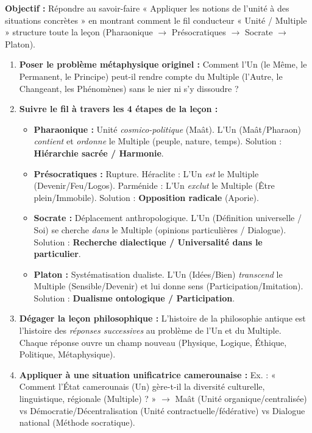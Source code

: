 \documentclass[11pt]{article}
\begin{document}
\begin{methode}
\textbf{Objectif :} Répondre au savoir-faire « Appliquer les notions de l'unité à des situations concrètes » en montrant comment le fil conducteur « Unité / Multiple » structure toute la leçon (Pharaonique $\rightarrow$ Présocratiques $\rightarrow$ Socrate $\rightarrow$ Platon).
\begin{enumerate}
    \item \textbf{Poser le problème métaphysique originel :} Comment l'Un (le Même, le Permanent, le Principe) peut-il rendre compte du Multiple (l'Autre, le Changeant, les Phénomènes) sans le nier ni s'y dissoudre ?
    \item \textbf{Suivre le fil à travers les 4 étapes de la leçon :}
        \begin{itemize}
            \item \textbf{Pharaonique :} Unité \emph{cosmico-politique} (Maât). L'Un (Maât/Pharaon) \emph{contient} et \emph{ordonne} le Multiple (peuple, nature, temps). Solution : \textbf{Hiérarchie sacrée / Harmonie}.
            \item \textbf{Présocratiques :} Rupture. Héraclite : L'Un \emph{est} le Multiple (Devenir/Feu/Logos). Parménide : L'Un \emph{exclut} le Multiple (Être plein/Immobile). Solution : \textbf{Opposition radicale} (Aporie).
            \item \textbf{Socrate :} Déplacement anthropologique. L'Un (Définition universelle / Soi) se cherche \emph{dans} le Multiple (opinions particulières / Dialogue). Solution : \textbf{Recherche dialectique / Universalité dans le particulier}.
            \item \textbf{Platon :} Systématisation dualiste. L'Un (Idées/Bien) \emph{transcend} le Multiple (Sensible/Devenir) et lui donne sens (Participation/Imitation). Solution : \textbf{Dualisme ontologique / Participation}.
        \end{itemize}
    \item \textbf{Dégager la leçon philosophique :} L'histoire de la philosophie antique est l'histoire des \emph{réponses successives} au problème de l'Un et du Multiple. Chaque réponse ouvre un champ nouveau (Physique, Logique, Éthique, Politique, Métaphysique).
    \item \textbf{Appliquer à une situation unificatrice camerounaise :} Ex. : « Comment l'État camerounais (Un) gère-t-il la diversité culturelle, linguistique, régionale (Multiple) ? » $\rightarrow$ Maât (Unité organique/centralisée) vs Démocratie/Décentralisation (Unité contractuelle/fédérative) vs Dialogue national (Méthode socratique).
\end{enumerate}
\end{methode}
\end{document}
